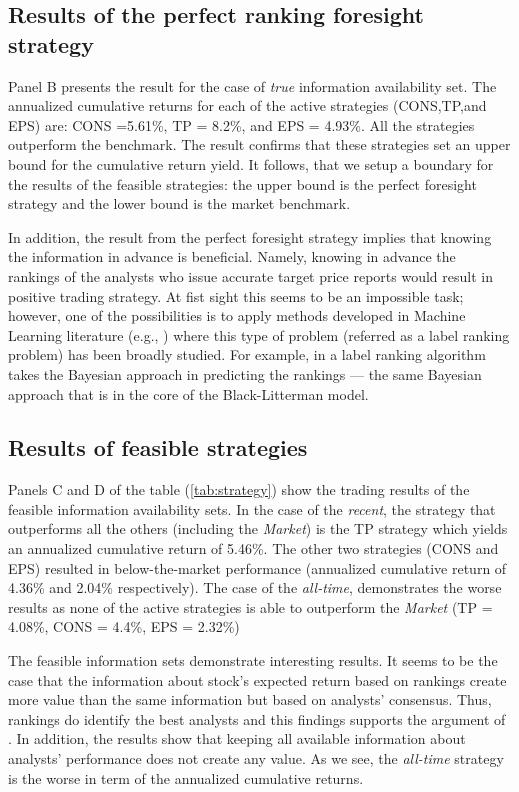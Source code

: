 \documentclass{article}\usepackage[]{graphicx}\usepackage[]{color}
\newcommand{\tr}{\textit{true}}
\newcommand{\naive}{\textit{recent}}
\newcommand{\default}{\textit{all-time}}
\begin{document}
\subsection{Results of the perfect ranking foresight strategy}
Panel B presents the result for the case of \tr{} information availability set. The annualized cumulative returns for each of the active strategies (CONS,TP,and EPS) are: CONS =5.61\%, TP = 8.2\%, and EPS = 4.93\%. All the strategies outperform the benchmark. The result confirms that these strategies set an upper bound for the cumulative return yield. It follows, that we setup a boundary for the results of the feasible strategies: the upper bound is the perfect foresight strategy and the lower bound is the market benchmark.

In addition, the result from the perfect foresight strategy implies that knowing the information in advance is beneficial. Namely, knowing in advance the rankings of the analysts who issue accurate target price reports would result in positive trading strategy. At fist sight this seems to be an impossible task; however, one of the possibilities is to apply methods developed in Machine Learning literature (e.g., \cite{aiguzhinov2010,brazdil2003}) where this type of problem (referred as a label ranking problem) has been broadly studied. For example, in \cite{aiguzhinov2010} a label ranking algorithm takes the Bayesian approach in predicting the rankings --- the same Bayesian approach that is in the core of the Black-Litterman model. 




\subsection{Results of feasible strategies}
Panels C and D of the table (\ref{tab:strategy}) show the trading results of the feasible information availability sets. In the case of the \naive{}, the strategy that outperforms all the others (including the \emph{Market}) is the TP strategy which yields an annualized cumulative return of 5.46\%. The other two strategies (CONS and EPS) resulted in below-the-market performance (annualized cumulative return of 4.36\% and 2.04\% respectively). The case of the \default{}, demonstrates the worse results as none of the active strategies is able to outperform the \emph{Market} (TP = 4.08\%, CONS = 4.4\%, EPS = 2.32\%)


The feasible information sets demonstrate interesting results. It seems to be the case that the information about stock's expected return based on rankings create more value than the same information but based on analysts' consensus. Thus, rankings do identify the best analysts and this findings supports the argument of \cite{desai2000ass}. In addition, the results show that keeping all available information about analysts' performance does not create any value. As we see, the \default{} strategy is the worse in term of the annualized cumulative returns. 
\end{document}
